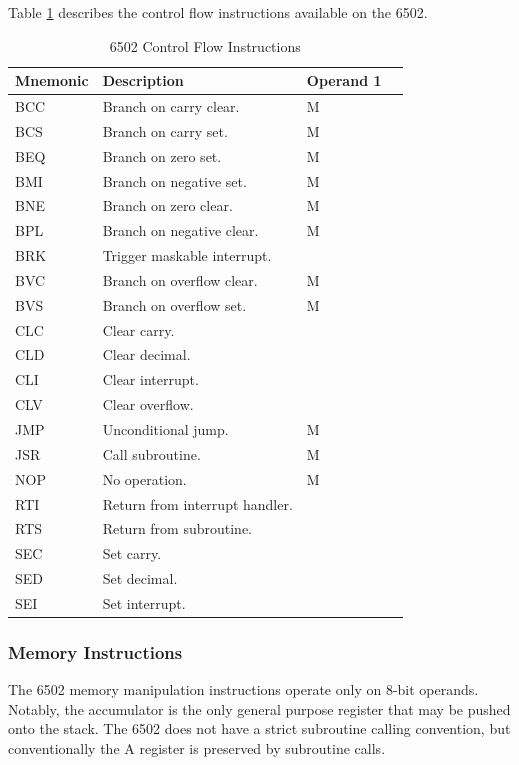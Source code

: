 \documentclass[journal]{IEEEtran}
\begin{document}
Table \ref{control} describes the control flow instructions available on the
6502.

\begin{table}
\centering
\begin{tabular}[H!]{|l|l|l|l|}
\hline
\textbf{Mnemonic} & \textbf{Description} & \textbf{Operand 1} \\
\hline
BCC & Branch on carry clear. & M \\
BCS & Branch on carry set. & M \\
BEQ & Branch on zero set. & M \\
BMI & Branch on negative set. & M \\
BNE & Branch on zero clear. & M \\
BPL & Branch on negative clear. & M \\
BRK & Trigger maskable interrupt. & \\
BVC & Branch on overflow clear. & M \\
BVS & Branch on overflow set. & M \\
CLC & Clear carry. & \\
CLD & Clear decimal. & \\
CLI & Clear interrupt. & \\
CLV & Clear overflow. & \\
JMP & Unconditional jump. & M \\
JSR & Call subroutine. & M \\
NOP & No operation. & M \\
RTI & Return from interrupt handler. & \\
RTS & Return from subroutine. & \\
SEC & Set carry. & \\
SED & Set decimal. & \\
SEI & Set interrupt. & \\
\hline
\end{tabular}
\caption{6502 Control Flow Instructions}
\label{control}
\end{table}

\subsubsection{Memory Instructions}

The 6502 memory manipulation instructions operate only on 8-bit operands.
Notably, the accumulator is the only general purpose register that may be pushed
onto the stack. The 6502 does not have a strict subroutine calling convention,
but conventionally the A register is preserved by subroutine calls.
\end{document}
